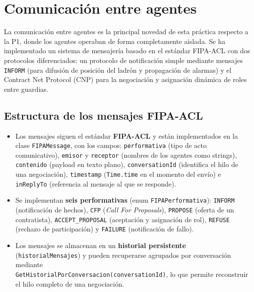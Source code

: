 \documentclass[a4paper,12pt]{article}
\begin{document}
\section{Comunicación entre agentes}

La comunicación entre agentes es la principal novedad de esta práctica respecto
a la P1, donde los agentes operaban de forma completamente aislada. Se ha
implementado un sistema de mensajería basado en el estándar FIPA-ACL con dos
protocolos diferenciados: un protocolo de notificación simple mediante mensajes
\texttt{INFORM} (para difusión de posición del ladrón y propagación de alarmas)
y el Contract Net Protocol (CNP) para la negociación y asignación dinámica de
roles entre guardias.


\subsection{Estructura de los mensajes FIPA-ACL}

\begin{itemize}

    \item Los mensajes siguen el estándar \textbf{FIPA-ACL} y están
    implementados en la clase \texttt{FIPAMessage}, con los campos:
    \texttt{performativa} (tipo de acto comunicativo), \texttt{emisor} y
    \texttt{receptor} (nombres de los agentes como strings), \texttt{contenido}
    (payload en texto plano), \texttt{conversationId} (identifica el hilo de
    una negociación), \texttt{timestamp} (\texttt{Time.time} en el momento del
    envío) e \texttt{inReplyTo} (referencia al mensaje al que se responde).

    \item Se implementan \textbf{seis performativas} (enum
    \texttt{FIPAPerformativa}): \texttt{INFORM} (notificación de hechos),
    \texttt{CFP} (\textit{Call For Proposals}), \texttt{PROPOSE} (oferta de
    un contratista), \texttt{ACCEPT\_PROPOSAL} (aceptación y asignación de
    rol), \texttt{REFUSE} (rechazo de participación) y \texttt{FAILURE}
    (notificación de fallo).

    \item Los mensajes se almacenan en un \textbf{historial persistente}
    (\texttt{historialMensajes}) y pueden recuperarse agrupados por conversación
    mediante \\ \texttt{GetHistorialPorConversacion(conversationId)}, lo que
    permite reconstruir el hilo completo de una negociación.

\end{itemize}
\end{document}
